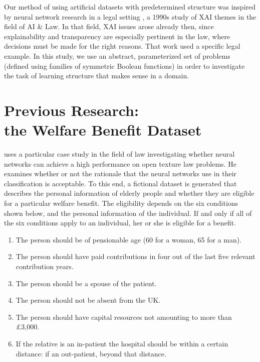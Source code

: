 \documentclass[letterpaper]{article} %
\begin{document}
Our method of using artificial datasets with predetermined structure was inspired by neural network research in a legal setting \cite{bench1993neural}, a 1990s study of XAI themes in the field of AI \& Law. In that field, XAI issues arose already then, since explainability and transparency are especially pertinent in the law, where decisions must be made for the right reasons. That work used a specific legal example. In this study, we use an abstract, parameterized set of problems (defined using families of symmetric Boolean functions) in order to investigate the task of learning structure that makes sense in a domain. %

\section{Previous Research:  \\the Welfare Benefit Dataset}
\cite{bench1993neural} uses a particular case study in the field of law investigating whether neural networks can achieve a high performance on open texture law problems. He examines whether or not the rationale that the neural networks use in their classification is acceptable. To this end, a fictional dataset is generated that describes the personal information of elderly people and whether they are eligible for a particular welfare benefit. The eligibility depends on the six conditions shown below, and the personal information of the individual. If and only if all of the six conditions apply to an individual, her or she is eligible for a benefit. 

\begin{enumerate}
\item
The person should be of pensionable age (60 for a woman, 65 for a man).
\item
The person should have paid contributions in four out of the last five relevant contribution years. 
\item
The person should be a spouse of the patient.
\item
The person should not be absent from the UK.
\item
The person should have capital resources not amounting to more than \pounds 3,000.
\item 
If the relative is an in-patient the hospital should be within a certain distance: if an out-patient, beyond that distance.
\end{enumerate}
\end{document}

